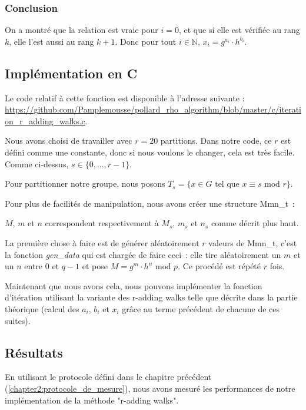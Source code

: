         \subsubsection*{Conclusion}
        On a montré que la relation est vraie pour $i = 0$, et que si elle est vérifiée au rang $k$, elle l'est aussi au rang $k + 1$. Donc pour tout $i \in \mathbb{N}$, $x_i = g^{a_i} \cdot h^{b_i}$.

      \subsection{Implémentation en C}
      \label{chapter3:r-adding:implémentation}
      Le code relatif à cette fonction est disponible à l'adresse suivante : \url{https://github.com/Pamplemousse/pollard_rho_algorithm/blob/master/c/iteration_r_adding_walks.c}.

      Nous avons choisi de travailler avec $r = 20$ partitions. Dans notre code, ce $r$ est défini comme une constante, donc si nous voulons le changer, cela est très facile. Comme ci-dessus, $s \in \{ 0,..., r - 1 \}$.

      Pour partitionner notre groupe, nous posons $T_s = \{ x \in G \text{ tel que } x \equiv s \text{ mod } r \}$.

      Pour plus de facilités de manipulation, nous avons créer une structure Mmn\_t~:

      

      $M$, $m$ et $n$ correspondent respectivement à $M_s$, $m_s$ et $n_s$ comme décrit plus haut.

      La première chose à faire est de générer aléatoirement $r$ valeurs de Mmn\_t, c'est la fonction \textit{gen\_data} qui est chargée de faire ceci~: elle tire aléatoirement un $m$ et un $n$ entre $0$ et $q - 1$ et pose $M = g^m \cdot h^n \text{ mod } p$. Ce procédé est répété $r$ fois.

      Maintenant que nous avons cela, nous pouvons implémenter la fonction d'itération utilisant la variante des r-adding walks telle que décrite dans la partie théorique (calcul des $a_i$, $b_i$ et $x_i$ grâce au terme précédent de chacune de ces suites).

      \subsection{Résultats}
      En utilisant le protocole défini dans le chapitre précédent (\ref{chapter2:protocole_de_mesure}), nous avons mesuré les performances de notre implémentation de la méthode "r-adding walks".

